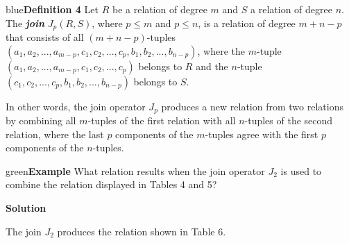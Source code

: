 \documentclass[11pt]{article}
\newenvironment{example}[1][\unskip]{\begin{mybox}{green}{\textbf{Example} {#1}}}{\end{mybox}}
\newenvironment{definition}[1]{\begin{mybox}{blue}{\textbf{Definition #1}}}{\end{mybox}}
\begin{document}
\begin{definition}{4}
Let $R$ be a relation of degree $m$ and $S$ a relation of degree $n$. The \textbf{\textit{join}} $J_p(R, S)$, where $p \leq m$ and $p \leq n$, is a relation of degree $m + n - p$ that consists of all $(m + n - p)$-tuples $(a_1, a_2, ..., a_{m-p}, c_1, c_2, ..., c_p, b_1, b_2, ..., b_{n-p})$, where the $m$-tuple $(a_1, a_2, ..., a_{m-p}, c_1, c_2, ..., c_p)$ belongs to $R$ and the $n$-tuple $(c_1, c_2, ..., c_p, b_1, b_2, ..., b_{n-p})$ belongs to $S$.
\end{definition}

In other words, the join operator $J_p$ produces a new relation from two relations by combining all $m$-tuples of the first relation with all $n$-tuples of the second relation, where the last $p$ components of the $m$-tuples agree with the first $p$ components of the $n$-tuples.

\begin{example}
What relation results when the join operator $J_2$ is used to combine the relation displayed in Tables 4 and 5?

\textbf{Solution}

The join $J_2$ produces the relation shown in Table 6.
\end{example}
\end{document}
